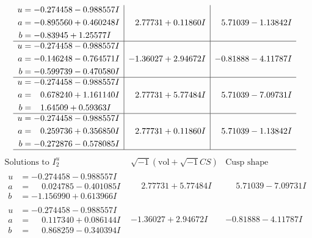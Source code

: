 \documentclass[1p]{elsarticle_modified}
\theoremstyle{definition}
\newcommand{\I}{\sqrt{-1}}
\begin{document}
$$\begin{array}{c|c|c}
\begin{aligned}
u &= -0.274458 - 0.988557 I \\
a &= -0.895560 + 0.460248 I \\
b &= -0.83945 + 1.25577 I\end{aligned}
 & \phantom{-}2.77731 + 0.11860 I & \phantom{-}5.71039 - 1.13842 I \\ \hline\begin{aligned}
u &= -0.274458 - 0.988557 I \\
a &= -0.146248 - 0.764571 I \\
b &= -0.599739 - 0.470580 I\end{aligned}
 & -1.36027 + 2.94672 I & -0.81888 - 4.11787 I \\ \hline\begin{aligned}
u &= -0.274458 - 0.988557 I \\
a &= \phantom{-}0.678240 + 1.161140 I \\
b &= \phantom{-}1.64509 + 0.59363 I\end{aligned}
 & \phantom{-}2.77731 + 5.77484 I & \phantom{-}5.71039 - 7.09731 I \\ \hline\begin{aligned}
u &= -0.274458 - 0.988557 I \\
a &= \phantom{-}0.259736 + 0.356850 I \\
b &= -0.272876 - 0.578085 I\end{aligned}
 & \phantom{-}2.77731 + 0.11860 I & \phantom{-}5.71039 - 1.13842 I\\
 \hline 
 \end{array}$$\newpage$$\begin{array}{c|c|c}  
\text{Solutions to }I^u_{2}& \I (\text{vol} + \sqrt{-1}CS) & \text{Cusp shape}\\
 \hline 
\begin{aligned}
u &= -0.274458 - 0.988557 I \\
a &= \phantom{-}0.024785 - 0.401085 I \\
b &= -1.156990 + 0.613966 I\end{aligned}
 & \phantom{-}2.77731 + 5.77484 I & \phantom{-}5.71039 - 7.09731 I \\ \hline\begin{aligned}
u &= -0.274458 - 0.988557 I \\
a &= \phantom{-}0.117340 + 0.086144 I \\
b &= \phantom{-}0.868259 - 0.340394 I\end{aligned}
 & -1.36027 + 2.94672 I & -0.81888 - 4.11787 I \\ \hline\begin{aligned}

\end{aligned}
\end{array}$$
\end{document}
